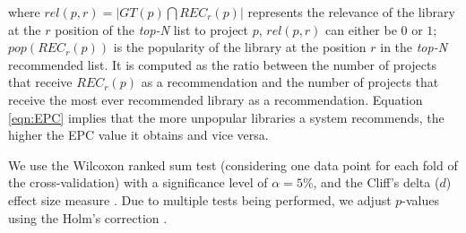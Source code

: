 \noindent
where $rel(p,r)=\left |  GT(p) \bigcap  REC_{r}(p) \right |$ represents the relevance of the library at the $r$ position of the \emph{top-N} list to project $p$, $rel(p,r)$ can either be $0$ or $1$; $pop(REC_{r}(p))$ is the popularity of the library at the position $r$ in the \emph{top-N} recommended list. It is computed as the ratio between the number of projects that receive $REC_{r}(p)$ as a recommendation and the number of projects that receive the most ever recommended library as a recommendation. Equation \ref{eqn:EPC} implies that the more unpopular libraries a system recommends, the higher the EPC value it obtains and vice versa. %






We use the Wilcoxon ranked sum test (considering one data point for each fold of the cross-validation) with a significance level of $\alpha=5\%$, and the Cliff's delta ($d$) effect size measure \cite{Cliff:2005}. Due to multiple tests being performed, we adjust $p$-values using the Holm's correction \cite{holm}.



